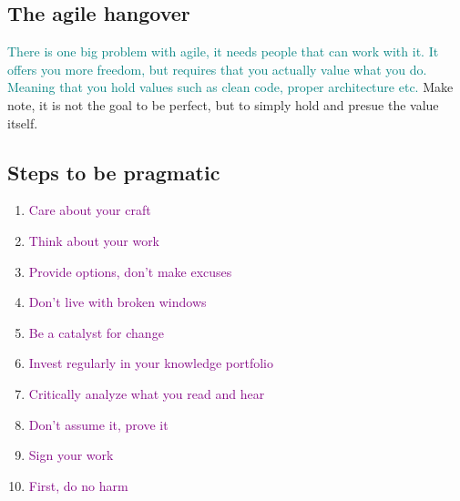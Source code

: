 \documentclass[main.tex,fontsize=8pt,paper=a4,paper=portrait,DIV=calc,]{scrartcl}
\begin{document}
\subsection{The agile hangover}
\textcolor{teal}{There is one big problem with agile, it needs people that can work with it.\newline
It offers you more freedom, but requires that you actually value what you do. Meaning that you hold values such as clean code, proper architecture etc.}
Make note, it is not the goal to be perfect, but to simply hold and presue the value itself.

\subsection{Steps to be pragmatic}
\begin{enumerate}
\item \textcolor{purple}{Care about your craft}
\item \textcolor{purple}{Think about your work}
\item \textcolor{purple}{Provide options, don't make excuses}
\item \textcolor{purple}{Don't live with broken windows}
\item \textcolor{purple}{Be a catalyst for change}
\item \textcolor{purple}{Invest regularly in your knowledge portfolio}
\item \textcolor{purple}{Critically analyze what you read and hear}
\item \textcolor{purple}{Don't assume it, prove it}
\item \textcolor{purple}{Sign your work}
\item \textcolor{purple}{First, do no harm}

\end{enumerate} 




\end{document}
